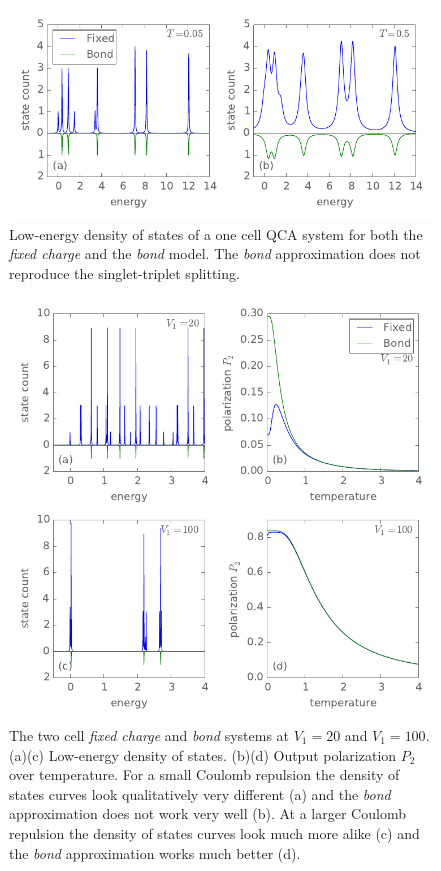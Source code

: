 %
\begin{figure}
  \center
  \includegraphics{bond_approximation1}
  \caption{Low-energy density of states of a one cell QCA system for both the
  \emph{fixed charge} and the \emph{bond} model. The \emph{bond} approximation
  does not reproduce the singlet-triplet splitting.}
  \label{fig:bond_approximation1}
\end{figure}
%
\begin{figure}
  \center
  \includegraphics{bond_approximation2}
  \caption{The two cell \emph{fixed charge} and \emph{bond} systems at $V_1 =
  20$ and $V_1 = 100$. (a)(c) Low-energy density of states. (b)(d) Output
  polarization $P_2$ over temperature. For a small Coulomb repulsion the density
  of states curves look qualitatively very different (a) and the \emph{bond}
  approximation does not work very well (b). At a larger Coulomb repulsion the
  density of states curves look much more alike (c) and the \emph{bond}
  approximation works much better (d).}
  \label{fig:bond_approximation2}
\end{figure}
